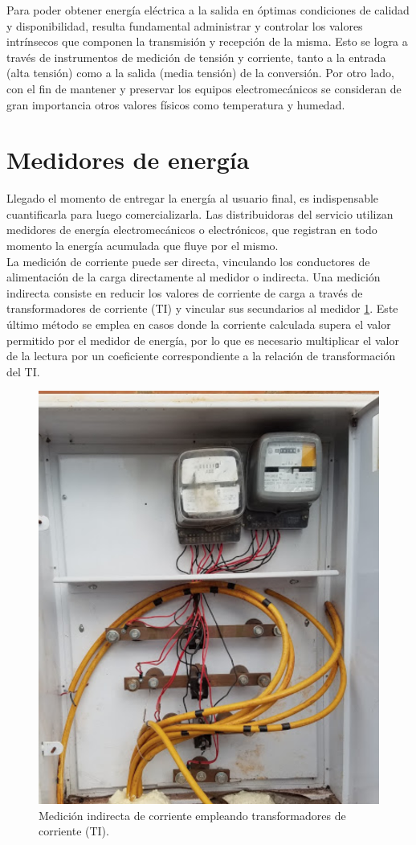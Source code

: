 Para poder obtener energía eléctrica a la salida en óptimas condiciones de calidad y disponibilidad, resulta fundamental administrar y controlar los valores intrínsecos que componen la transmisión y recepción de la misma. Esto se logra a través de instrumentos de medición de tensión y corriente, tanto a la entrada (alta tensión) como a la salida (media tensión) de la conversión. Por otro lado, con el fin de mantener y preservar los equipos electromecánicos se consideran de gran importancia otros valores físicos como temperatura y humedad.\\
\section{Medidores de energía}
Llegado el momento de entregar la energía al usuario final, es indispensable cuantificarla para luego comercializarla. Las distribuidoras del servicio utilizan medidores de energía electromecánicos o electrónicos, que registran en todo momento la energía acumulada que fluye por el mismo.\\
La medición de corriente puede ser directa, vinculando los conductores de alimentación de la carga directamente al medidor o indirecta. Una medición indirecta consiste en reducir los valores de corriente de carga a través de transformadores de corriente (TI) y vincular sus secundarios al medidor \ref{fig:medicioncorrienteconti}. Este último método se emplea en casos donde la corriente calculada supera el valor permitido por el medidor de energía, por lo que es necesario multiplicar el valor de la lectura por un coeficiente correspondiente a la relación de transformación del TI.\\

\begin{figure}
	\centering
	\includegraphics[width=0.5\linewidth]{Figures/Medicion_corriente_con_TI}
	\caption[]{Medición indirecta de corriente empleando transformadores de corriente (TI).\protect\footnotemark}
	\label{fig:medicioncorrienteconti}
\end{figure}

